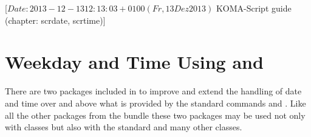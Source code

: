 %
%
%
%
%
%
%
%
% 
%
%
%
%

                 [$Date: 2013-12-13 12:13:03 +0100 (Fr, 13 Dez 2013) $
                  KOMA-Script guide (chapter: scrdate, scrtime)]


\chapter{Weekday and Time Using  and
  }

There are two packages included in {\KOMAScript} to improve and extend
the handling of date and time over and above
what is provided by the standard commands  and
. Like all the other packages from the {\KOMAScript}
bundle these two packages may be used not only with {\KOMAScript}
classes but also with the standard and many other classes.

